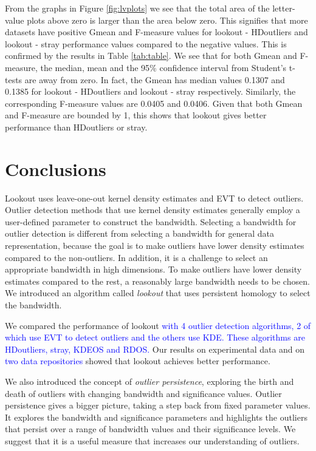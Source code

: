 \documentclass[
]{article}
\begin{document}
From the graphs in Figure \ref{fig:lvplots} we see that the total area
of the letter-value plots above zero is larger than the area below zero.
This signifies that more datasets have positive Gmean and F-measure
values for lookout - HDoutliers and lookout - stray performance values
compared to the negative values. This is confirmed by the results in
Table \ref{tab:table}. We see that for both Gmean and F-measure, the
median, mean and the 95\% confidence interval from Student's t-tests are
away from zero. In fact, the Gmean has median values 0.1307 and 0.1385
for lookout - HDoutliers and lookout - stray respectively. Similarly,
the corresponding F-measure values are 0.0405 and 0.0406. Given that
both Gmean and F-measure are bounded by 1, this shows that lookout gives
better performance than HDoutliers or stray.

\hypertarget{sec:conclusions}{%
\section{Conclusions}\label{sec:conclusions}}

Lookout uses leave-one-out kernel density estimates and EVT to detect
outliers. Outlier detection methods that use kernel density estimates
generally employ a user-defined parameter to construct the bandwidth.
Selecting a bandwidth for outlier detection is different from selecting
a bandwidth for general data representation, because the goal is to make
outliers have lower density estimates compared to the non-outliers. In
addition, it is a challenge to select an appropriate bandwidth in high
dimensions. To make outliers have lower density estimates compared to
the rest, a reasonably large bandwidth needs to be chosen. We introduced
an algorithm called \emph{lookout} that uses persistent homology to
select the bandwidth.

We compared the performance of lookout
\textcolor{blue}{with 4 outlier detection algorithms, 2 of which use EVT to detect outliers and the others use KDE. These algorithms are HDoutliers, stray, KDEOS and RDOS.}
Our results on experimental data and on
\textcolor{blue}{two data repositories} showed that lookout achieves
better performance.

We also introduced the concept of \emph{outlier persistence}, exploring
the birth and death of outliers with changing bandwidth and significance
values. Outlier persistence gives a bigger picture, taking a step back
from fixed parameter values. It explores the bandwidth and significance
parameters and highlights the outliers that persist over a range of
bandwidth values and their significance levels. We suggest that it is a
useful measure that increases our understanding of outliers.
\end{document}
